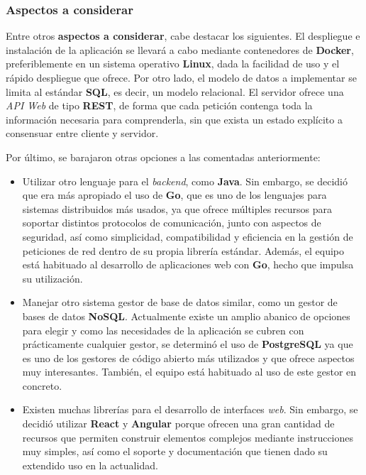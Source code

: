 \documentclass[11pt, a4paper, titlepage]{article}
\begin{document}
\subsubsection{Aspectos a considerar}

Entre otros \textbf{aspectos a considerar}, cabe destacar los siguientes. El despliegue e instalación de la aplicación se llevará a cabo mediante contenedores de \textbf{Docker}, preferiblemente en un sistema operativo \textbf{Linux}, dada la facilidad de uso y el rápido despliegue que ofrece. Por otro lado, el modelo de datos a implementar se limita al estándar \textbf{SQL}, es decir, un modelo relacional. El servidor ofrece una \textit{API Web} de tipo \textbf{REST}, de forma que cada petición contenga toda la información necesaria para comprenderla, sin que exista un estado explícito a consensuar entre cliente y servidor. \newline

Por último, se barajaron otras opciones a las comentadas anteriormente:

\begin{itemize}
    \item Utilizar otro lenguaje para el \textit{backend}, como \textbf{Java}. Sin embargo, se decidió que era más apropiado el uso de \textbf{Go}, que es uno de los lenguajes para sistemas distribuidos más usados, ya que ofrece múltiples recursos para soportar distintos protocolos de comunicación, junto con aspectos de seguridad, así como simplicidad, compatibilidad y eficiencia en la gestión de peticiones de red dentro de su propia librería estándar. Además, el equipo está habituado al desarrollo de aplicaciones web con \textbf{Go}, hecho que impulsa su utilización.
    
    \item  Manejar otro sistema gestor de base de datos similar, como un gestor de bases de datos \textbf{NoSQL}. Actualmente existe un amplio abanico de opciones para elegir y como las necesidades de la aplicación se cubren con prácticamente cualquier gestor, se determinó el uso de  \textbf{PostgreSQL} ya que es uno de los gestores de código abierto más utilizados y que ofrece aspectos muy interesantes. También, el equipo está habituado al uso de este gestor en concreto.
    
    \item Existen muchas librerías para el desarrollo de interfaces \textit{web}. Sin embargo, se decidió utilizar  \textbf{React} y \textbf{Angular} porque ofrecen una gran cantidad de recursos que permiten construir elementos complejos mediante instrucciones muy simples, así como el soporte y documentación que tienen dado su extendido uso en la actualidad.
\end{itemize}
\end{document}
